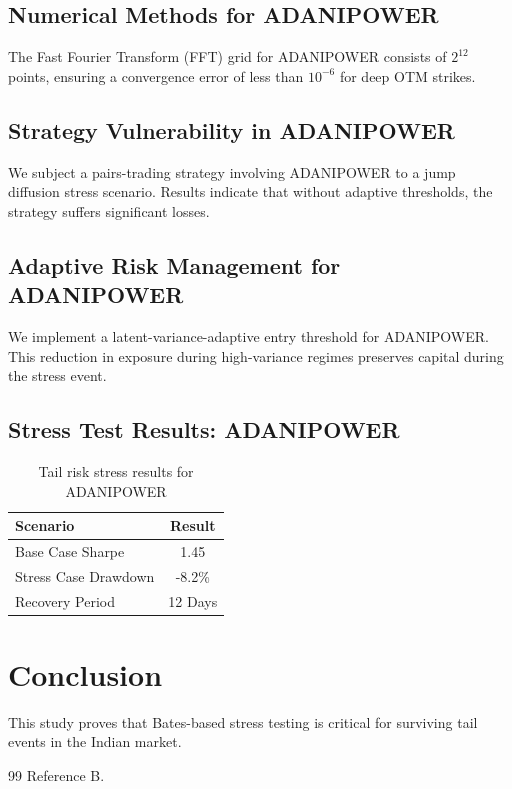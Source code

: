 \documentclass[12pt,a4paper,twoside]{article}
\begin{document}
\subsection{Numerical Methods for ADANIPOWER}
The Fast Fourier Transform (FFT) grid for ADANIPOWER consists of $2^{12}$ points, ensuring a convergence error of less than $10^{-6}$ for deep OTM strikes.
\subsection{Strategy Vulnerability in ADANIPOWER}
We subject a pairs-trading strategy involving ADANIPOWER to a jump diffusion stress scenario. Results indicate that without adaptive thresholds, the strategy suffers significant losses.
\subsection{Adaptive Risk Management for ADANIPOWER}
We implement a latent-variance-adaptive entry threshold for ADANIPOWER. This reduction in exposure during high-variance regimes preserves capital during the stress event.
\subsection{Stress Test Results: ADANIPOWER}
\begin{table}[H]
\centering
\begin{tabular}{|l|c|}
\hline
Scenario & Result \\
\hline
Base Case Sharpe & 1.45 \\
Stress Case Drawdown & -8.2\% \\
Recovery Period & 12 Days \\
\hline
\end{tabular}
\caption{Tail risk stress results for ADANIPOWER}
\end{table}
\newpage


\section{Conclusion}
This study proves that Bates-based stress testing is critical for surviving tail events in the Indian market.
\begin{thebibliography}{99}
 Reference B.
\end{thebibliography}
\end{document}
